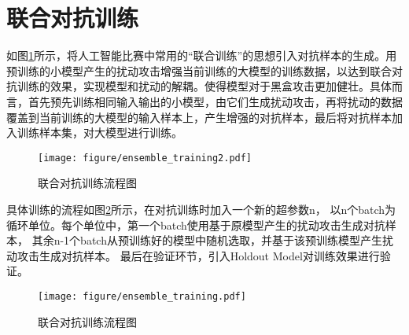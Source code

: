\section{联合对抗训练}
如图\ref{fig:ensemble_training2}所示，将人工智能比赛中常用的“联合训练”的思想引入对抗样本的生成。用预训练的小模型产生的扰动攻击增强当前训练的大模型的训练数据，以达到联合对抗训练的效果，实现模型和扰动的解耦。使得模型对于黑盒攻击更加健壮。具体而言，首先预先训练相同输入输出的小模型，由它们生成扰动攻击，再将扰动的数据覆盖到当前训练的大模型的输入样本上，产生增强的对抗样本，最后将对抗样本加入训练样本集，对大模型进行训练。
\begin{figure}[htbp]
    \centering
    \texttt{[image: figure/ensemble\_training2.pdf]}
    \caption{联合对抗训练流程图}
    \label{fig:ensemble_training2}
\end{figure}


具体训练的流程如图\ref{fig:ensemble_training}所示，在对抗训练时加入一个新的超参数n，
以n个batch为循环单位。每个单位中，第一个batch使用基于原模型产生的扰动攻击生成对抗样本，
其余n-1个batch从预训练好的模型中随机选取，并基于该预训练模型产生扰动攻击生成对抗样本。
最后在验证环节，引入Holdout Model对训练效果进行验证。
\begin{figure}[htbp]
    \centering
    \texttt{[image: figure/ensemble\_training.pdf]}
    \caption{联合对抗训练流程图}
    \label{fig:ensemble_training}
\end{figure}